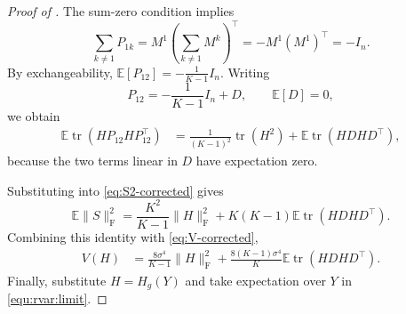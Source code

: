 \documentclass[12pt]{article}
\newcommand{\tran}{^\intercal}
\theoremstyle{general}
\begin{document}
\begin{proof}[Proof of ]
The sum-zero condition implies
\[
\sum_{k\neq1}P_{1k}
=
M^1\left(\sum_{k\neq1}M^k\right)\tran
=
-M^1(M^1)\tran
=
-I_n.
\]
By exchangeability,
$\mathbb E[P_{12}]=-\frac1{K-1}I_n$.
Writing
\[
P_{12}
=
-\frac1{K-1}I_n+D,
\qquad
\mathbb E[D]=0,
\]
we obtain
\begin{align*}
\mathbb E\operatorname{tr}
\left(
H P_{12}H P_{12}\tran
\right)
&=
\frac1{(K-1)^2}\operatorname{tr}(H^2)
+
\mathbb E\operatorname{tr}
\left(
H D H D\tran
\right),
\end{align*}
because the two terms linear in $D$ have expectation zero.

Substituting into \eqref{eq:S2-corrected} gives
\[
\mathbb E\|S\|_{\mathrm F}^2
=
\frac{K^2}{K-1}\|H\|_{\mathrm F}^2
+
K(K-1)
\mathbb E\operatorname{tr}
\left(
H D H D\tran
\right).
\]
Combining this identity with \eqref{eq:V-corrected},
\begin{align*}
V(H)
&=
\frac{8\sigma^4}{K-1}\|H\|_{\mathrm F}^2+
\frac{8(K-1)\sigma^4}{K}
\mathbb E\operatorname{tr}
\left(
H D H D\tran
\right).
\end{align*}
Finally, substitute $H=H_g(Y)$ and take expectation over $Y$ in
\eqref{equ:rvar:limit}.
\end{proof}
\end{document}
